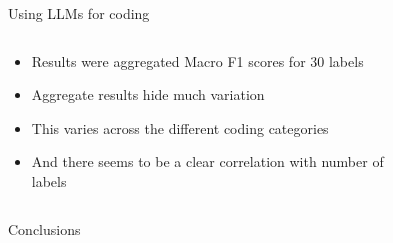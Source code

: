 \documentclass[9pt,aspectratio=169]{beamer}
\begin{document}
\begin{frame}{Using LLMs for coding}
	\begin{columns}
		\begin{column}{0.4\linewidth}
			\begin{itemize}
				\item<1-> Results were aggregated Macro F1 scores for 30 labels
				\item<2-> Aggregate results hide much variation
				\item<3-> This varies across the different coding categories
				\item<4-> And there seems to be a clear correlation with number of labels
			\end{itemize}
		\end{column}
		\begin{column}{0.6\linewidth}
			\begin{figure}
			\end{figure}
		\end{column}
	\end{columns}


	
\end{frame}

	\begin{frame}{Conclusions}
\end{frame}
%	
%	
%	
%	
%	
%	 
%	
%	
%	
%	



\begin{frame}
	
\end{frame}
\end{document}
